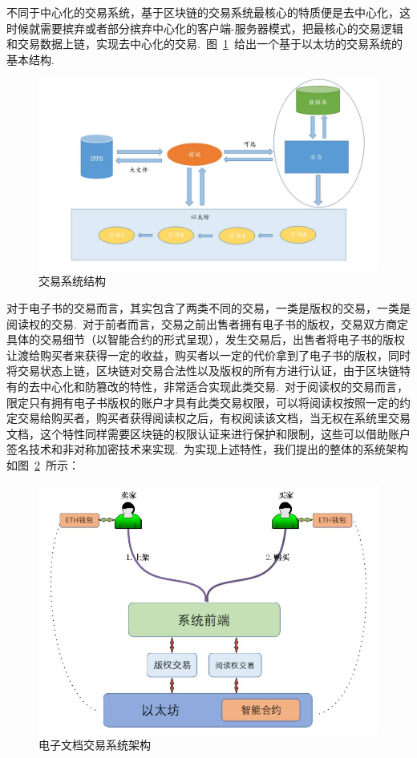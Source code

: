 \documentclass[a4paper,12pt,titlepage]{ctexart}
\begin{document}
不同于中心化的交易系统，基于区块链的交易系统最核心的特质便是去中心化，这时候就需要摈弃或者部分摈弃中心化的客户端-服务器模式，把最核心的交易逻辑和交易数据上链，实现去中心化的交易.~图~\ref{fig13}~给出一个基于以太坊的交易系统的基本结构.~\par
\begin{figure}[!hbp]
	\centering
	\includegraphics[scale=0.30]{fig13.jpg}
	\caption{交易系统结构}
	\label{fig13}
\end{figure}
对于电子书的交易而言，其实包含了两类不同的交易，一类是版权的交易，一类是阅读权的交易.~对于前者而言，交易之前出售者拥有电子书的版权，交易双方商定具体的交易细节（以智能合约的形式呈现），发生交易后，出售者将电子书的版权让渡给购买者来获得一定的收益，购买者以一定的代价拿到了电子书的版权，同时将交易状态上链，区块链对交易合法性以及版权的所有方进行认证，由于区块链特有的去中心化和防篡改的特性，非常适合实现此类交易.~对于阅读权的交易而言，限定只有拥有电子书版权的账户才具有此类交易权限，可以将阅读权按照一定的约定交易给购买者，购买者获得阅读权之后，有权阅读该文档，当无权在系统里交易文档，这个特性同样需要区块链的权限认证来进行保护和限制，这些可以借助账户签名技术和非对称加密技术来实现.~为实现上述特性，我们提出的整体的系统架构如图~\ref{fig14}~所示：\par
\begin{figure}[!hbp]
	\centering
	\includegraphics[scale=0.5]{fig14.jpg}
	\caption{电子文档交易系统架构}
	\label{fig14}
\end{figure}
\end{document}
